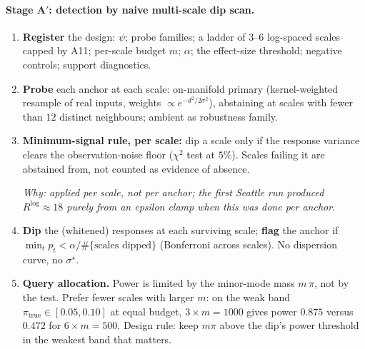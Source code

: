 \documentclass[11pt]{article}
\newcommand{\why}[1]{\par\noindent\textcolor{muted}{\small\itshape Why: #1}}
\begin{document}
\paragraph{Stage A$'$: detection by naive multi-scale dip scan.}
\begin{enumerate}[label=\textbf{A\arabic*.},leftmargin=2.7em,itemsep=2pt]
  \item \textbf{Register} the design: $\psi$; probe families; a ladder of $3$--$6$
  log-spaced scales capped by A11; per-scale budget $m$; $\alpha$; the effect-size
  threshold; negative controls; support diagnostics.
  \item \textbf{Probe} each anchor at each scale: on-manifold primary (kernel-weighted
  resample of real inputs, weights $\propto e^{-d^2/2\sigma^2}$), abstaining at scales with
  fewer than $12$ distinct neighbours; ambient as robustness family.
  \item \textbf{Minimum-signal rule, per scale:} dip a scale only if the response variance
  clears the observation-noise floor ($\chi^2$ test at $5\%$). Scales failing it are
  abstained from, not counted as evidence of absence. \why{applied per scale, not per
  anchor; the first Seattle run produced $R^{\log}\approx 18$ purely from an epsilon clamp
  when this was done per anchor.}
  \item \textbf{Dip} the (whitened) responses at each surviving scale; \textbf{flag} the
  anchor if $\min_t p_t < \alpha / \#\{\text{scales dipped}\}$ (Bonferroni across scales).
  No dispersion curve, no $\sigma^\star$.
  \item \textbf{Query allocation.} Power is limited by the minor-mode mass $m\,\pi$, not by
  the test. Prefer fewer scales with larger $m$: on the weak band
  $\pi_{\mathrm{true}}\in[0.05,0.10]$ at equal budget, $3\times m{=}1000$ gives power
  $0.875$ versus $0.472$ for $6\times m{=}500$. Design rule: keep $m\pi$ above the dip's
  power threshold in the weakest band that matters.
\end{enumerate}
\end{document}
